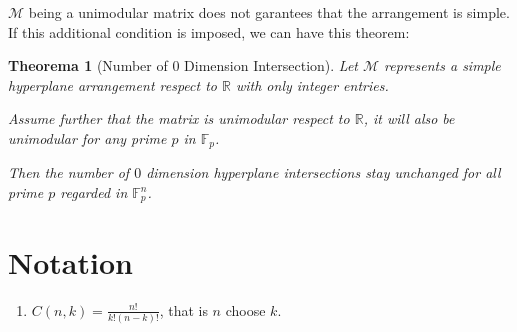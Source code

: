 \documentclass[12pt, a4paper]{article}
\newtheorem{theorem}{Theorema}[subsection]
\theoremstyle{definition}
\theoremstyle{remark}
\newcommand{\bb}[1]{\mathbb{#1}}
\begin{document}
$\mathcal{M}$ being a unimodular matrix does not garantees that the arrangement is simple. If this additional condition is imposed, we can have this theorem: 

\begin{theorem}[Number of 0 Dimension Intersection]
	Let $\mathcal{M}$ represents a simple hyperplane arrangement respect to $\bb{R}$ with only integer entries.

	Assume further that the matrix is unimodular respect to $\bb{R}$, it will also be unimodular for any prime $p$ in $\mathbb{F}_p$.

	Then the number of $0$ dimension hyperplane intersections stay unchanged for all prime $p$ regarded in $\mathbb{F}_p^n$.
\end{theorem}

\section*{Notation}

\begin{enumerate}
	\item $C(n, k) = \frac{n!}{k!(n-k)!}$, that is $n$ choose $k$.
\end{enumerate}
\end{document}
